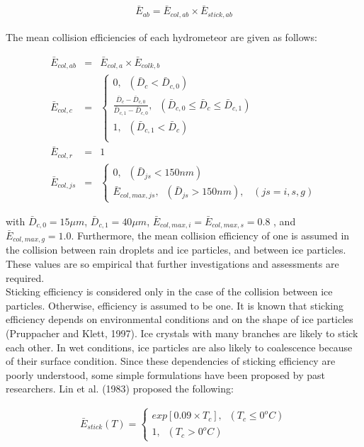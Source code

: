 \begin{eqnarray}
\bar{E}_{ab}=\bar{E}_{col,ab}\times\bar{E}_{stick,ab}\label{sn180}
\end{eqnarray}

The mean collision efficiencies of each hydrometeor are given as follows:

\begin{eqnarray}
\bar{E}_{col,ab}&=&\bar{E}_{col,a}\times\bar{E}_{colk,b}\label{sn181}\\
\bar{E}_{col,c}&=&
\left\{
\begin{array}{l}
0,\;\;(\bar{D}_{c}<\bar{D}_{c,0}) \\
\frac{\bar{D}_{c}-\bar{D}_{c,0}}{\bar{D}_{c,1}-\bar{D}_{c,0}},\;\;(\bar{D}_{c,0}\leq\bar{D}_{c}\leq\bar{D}_{c,1}) \\
1,\;\;(\bar{D}_{c,1}<\bar{D}_{c}) \\
\end{array}
\label{sn182}
\right.\\
\bar{E}_{col,r}&=&1\label{sn183}\\
\bar{E}_{col,js}&=&
\left\{
\begin{array}{l}
0,\;\;(\bar{D}_{js}<150nm) \\
\bar{E}_{col,max,js},\;\;(\bar{D}_{js}>150nm),\;\;\;(js=i,s,g)
\label{sn184}
\end{array}
\right.
\end{eqnarray}


with $\bar{D}_{c,0} = 15\mu m$, $\bar{D}_{c,1} = 40 \mu m$, $\bar{E}_{col,max,i}=\bar{E}_{col,max,s}=0.8$ , and $\bar{E}_{col,max,g}=1.0$. Furthermore, the mean collision efficiency of one is assumed in the collision between rain droplets and ice particles, and between ice particles. These values are so empirical that further investigations and assessments are required.\\
Sticking efficiency is considered only in the case of the collision between ice particles. Otherwise, efficiency is assumed to be one. It is known that sticking efficiency depends on environmental conditions and on the shape of ice particles (Pruppacher and Klett, 1997). Ice crystals with many branches are likely to stick each other. In wet conditions, ice particles are also likely to coalescence because of their surface condition. Since these dependencies of sticking efficiency are poorly understood, some simple formulations have been proposed by past researchers. Lin et al. (1983) proposed the following:

\begin{eqnarray}
\bar{E}_{stick}(T)=
\left\{
\begin{array}{l}
exp[0.09\times T_{c}],\;\;(T_{c}\leq 0^{o}C) \\
1,\;\;(T_{c}> 0^{o}C)
\label{sn185}
\end{array}
\right.
\end{eqnarray}

